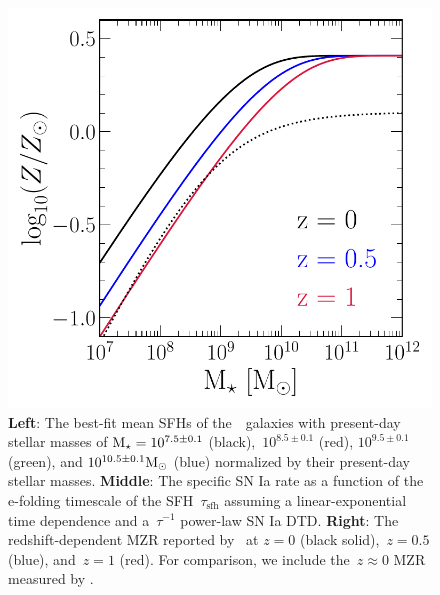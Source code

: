 \documentclass[foo.tex]{subfiles}
\begin{document}
\begin{figure}
\includegraphics[scale = 0.44]{mzr.pdf}
\caption{
\textbf{Left}: The best-fit mean SFHs of the~\um~galaxies with present-day
stellar masses of $\text{M}_\star = 10^{7.5 \pm 0.1}$ (black),~$10^{8.5 \pm 0.1}$ (red),
$10^{9.5 \pm 0.1}$ (green), and $10^{10.5 \pm 0.1} \text{M}_\odot$ (blue) normalized by
their present-day stellar masses.
\textbf{Middle}: The specific SN Ia rate as a function of the e-folding
timescale of the SFH~$\tau_\text{sfh}$ assuming a linear-exponential time
dependence and a~$\tau^{-1}$ power-law SN Ia DTD.
\textbf{Right}: The redshift-dependent MZR reported by~\citet{Zahid2014} at
$z = 0$ (black solid),~$z = 0.5$ (blue), and~$z = 1$ (red).
For comparison, we include the~$z \approx 0$ MZR measured by
\citet[][black dotted]{Andrews2013}.
}
\label{fig:sfh_mzr}
\end{figure}
\end{document}
